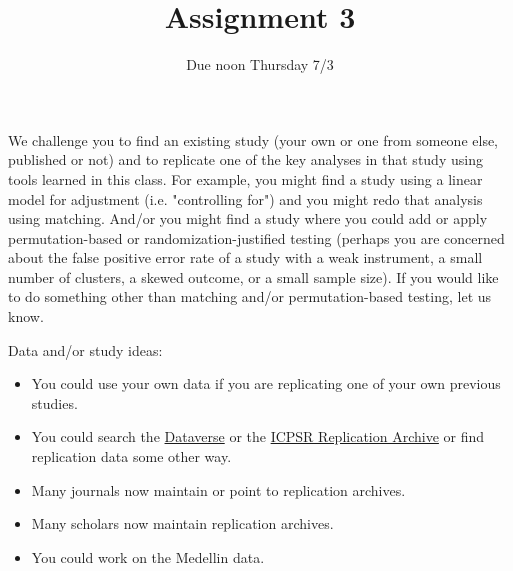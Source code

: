 \documentclass{article}
\title{Assignment 3}
\author{Due noon Thursday 7/3}
\begin{document}
\maketitle

We challenge you to find an existing study (your own or one from someone else,
published or not) and to replicate one of the key analyses in that study using
tools learned in this class. For example, you might find a study using a linear
model for adjustment (i.e. "controlling for") and you might redo that analysis
using matching. And/or you might find a study where you could add or apply
permutation-based or randomization-justified testing (perhaps you are concerned
about the false positive error rate of a study with a weak instrument, a small
number of clusters, a skewed outcome, or a small sample size). If you would like
to do something other than matching and/or permutation-based testing, let us
know.

Data and/or study ideas: \begin{itemize}
 \item You could use your own data if you are replicating one of your own
      previous studies.
 \item You could search the \href{http://dataverse.org/}{Dataverse} or the
  \href{https://www.icpsr.umich.edu/web/pages/ICPSR/index.html}{ICPSR
      Replication Archive} or find replication data some other way. 
 \item Many journals now maintain or point to replication archives.
 \item Many scholars now maintain replication archives.
 \item You could work on the Medellin data.
\end{itemize}
\end{document}
